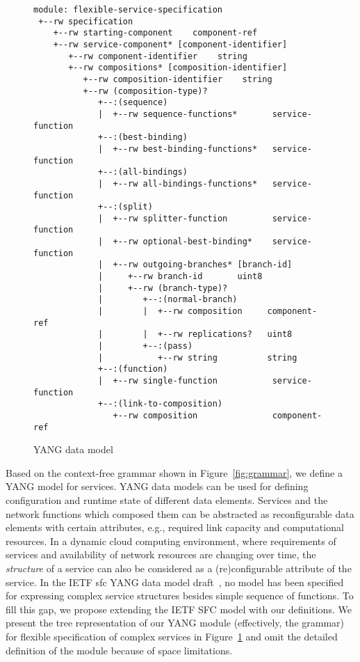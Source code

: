 \documentclass{sig-alternate-per}
\begin{document}
\begin{figure}[!t]
{\scriptsize
\begin{verbatim}
module: flexible-service-specification
 +--rw specification
    +--rw starting-component    component-ref
    +--rw service-component* [component-identifier]
       +--rw component-identifier    string
       +--rw compositions* [composition-identifier]
          +--rw composition-identifier    string
          +--rw (composition-type)?
             +--:(sequence)
             |  +--rw sequence-functions*       service-function
             +--:(best-binding)
             |  +--rw best-binding-functions*   service-function
             +--:(all-bindings)
             |  +--rw all-bindings-functions*   service-function
             +--:(split)
             |  +--rw splitter-function         service-function
             |  +--rw optional-best-binding*    service-function
             |  +--rw outgoing-branches* [branch-id]
             |     +--rw branch-id       uint8
             |     +--rw (branch-type)?
             |        +--:(normal-branch)
             |        |  +--rw composition     component-ref
             |        |  +--rw replications?   uint8
             |        +--:(pass)
             |           +--rw string          string
             +--:(function)
             |  +--rw single-function           service-function
             +--:(link-to-composition)
                +--rw composition               component-ref 
\end{verbatim}
}
\caption{YANG data model}
\label{fig:yangmodel}
\end{figure}

Based on the context-free grammar shown in Figure~\ref{fig:grammar}, we 
define a YANG model for services. YANG data models can be used for defining 
configuration and runtime state of different data elements. Services and the network
functions which composed them can be abstracted as reconfigurable data elements with
certain attributes, e.g., required link capacity and computational resources. 
In a dynamic cloud computing environment, where requirements of services and
availability of network resources are changing over time, the \emph{structure} of a service 
can also be considered as a (re)configurable attribute of the service. 
In the IETF \ac{sfc} YANG data model draft~\cite{draft-penno-sfc-yang-11}, no model has been specified for 
expressing complex service structures besides simple sequence of functions.
To fill this gap, we propose extending the IETF SFC model with our definitions.
We present the tree representation of our YANG module (effectively, the grammar)
for flexible specification of complex services in Figure~\ref{fig:yangmodel} and 
omit the detailed definition of the module because of space limitations.
\end{document}
